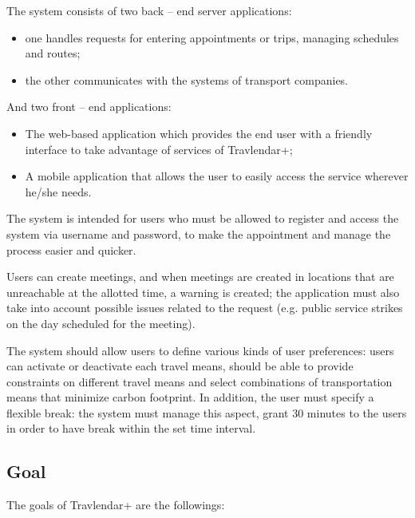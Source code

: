 \documentclass{article}
\begin{document}
	\bigskip
	The system consists of two back -- end server applications:
	\begin{itemize}
		\item one handles requests for entering appointments or trips, managing schedules and routes;
		\item the other communicates with the systems of transport companies.
	\end{itemize}

	\bigskip
	And two front -- end applications:
	\begin{itemize}
		\item The web-based application which provides the end user with a friendly interface to take advantage of services of Travlendar+;
		\item A mobile application that allows the user to easily access the service wherever he/she needs.
	\end{itemize}

	\bigskip
	The system is intended for users who must be allowed to register and access the system via username and password, to make the appointment and manage the process easier and quicker.

	Users can create meetings, and when meetings are created in locations that are unreachable at the allotted time, a warning is created; the application must also take into account possible issues related to the request (e.g. public service strikes on the day scheduled for the meeting). 
	
	\bigskip
	The system should allow users to define various kinds of user preferences: users can activate or deactivate each travel means, should be able to provide constraints on different travel means and select combinations of transportation means that minimize carbon footprint. In addition, the user must specify a flexible break: the system must manage this aspect, grant 30 minutes to the users in order to have break within the set time interval.
	
	
	\subsection{Goal}
	The goals of Travlendar+ are the followings:
\end{document}
